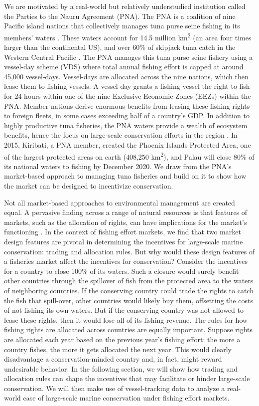 \documentclass[12pt]{article}
\begin{document}
We are motivated by a real-world but relatively understudied institution called the Parties to the Nauru Agreement (PNA). The PNA is a coalition of nine Pacific island nations that collectively manages tuna purse seine fishing in its members' waters \cite{havice_2013,aqorau_2018}. These waters account for 14.5 million km\textsuperscript{2} (an area four times larger than the continental US), and over 60\% of skipjack tuna catch in the Western Central Pacific \cite{havice_2013}. The PNA manages this tuna purse seine fishery using a vessel-day scheme (VDS) where total annual fishing effort is capped at around 45,000 vessel-days. Vessel-days are allocated across the nine nations, which then lease them to fishing vessels. A vessel-day grants a fishing vessel the right to fish for 24 hours within one of the nine Exclusive Economic Zones (EEZs) within the PNA. Member nations derive enormous benefits from leasing these fishing rights to foreign fleets, in some cases exceeding half of a country's GDP. In addition to highly productive tuna fisheries, the PNA waters provide a wealth of ecosystem benefits, hence the focus on large-scale conservation efforts in the region \cite{mcleod_2019}. In 2015, Kiribati, a PNA member, created the Phoenix Islands Protected Area, one of the largest protected areas on earth (408,250 km\textsuperscript{2}), and Palau will close 80\% of its national waters to fishing by December 2020. We draw from the PNA's market-based approach to managing tuna fisheries and build on it to show how the market can be designed to incentivize conservation.

Not all market-based approaches to environmental management are created equal. A pervasive finding across a range of natural resources is that features of markets, such as the allocation of rights, can have implications for the market's functioning \cite{libecap_1989}. In the context of fishing effort markets, we find that two market design features are pivotal in determining the incentives for large-scale marine conservation: trading and allocation rules. But why would these design features of a fisheries market affect the incentives for conservation? Consider the incentives for a country to close 100\% of its waters. Such a closure would surely benefit other countries through the spillover of fish from the protected area to the waters of neighboring countries. If the conserving country could trade the rights to catch the fish that spill-over, other countries would likely buy them, offsetting the costs of not fishing its own waters. But if the conserving country was not allowed to lease these rights, then it would lose all of its fishing revenue. The rules for how fishing rights are allocated across countries are equally important. Suppose rights are allocated each year based on the previous year's fishing effort: the more a country fishes, the more it gets allocated the next year. This would clearly disadvantage a conservation-minded country and, in fact, might reward undesirable behavior. In the following section, we will show how trading and allocation rules can shape the incentives that may facilitate or hinder large-scale conservation. We will then make use of vessel-tracking data to analyze a real-world case of large-scale marine conservation under fishing effort markets.
\end{document}
